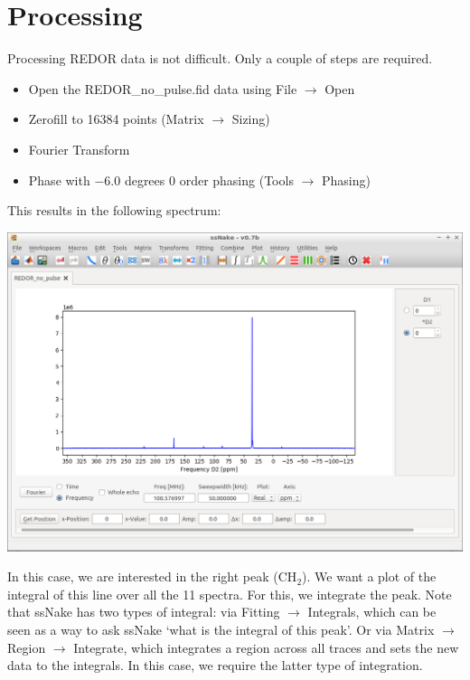 \documentclass[11pt,a4paper]{article}
\begin{document}
\section{Processing}
Processing REDOR data is not difficult.
Only a couple of steps are required.

\begin{itemize}
\item Open the REDOR\_no\_pulse.fid data using File $\longrightarrow$ Open
\item Zerofill to 16384 points (Matrix  $\longrightarrow$ Sizing)
\item Fourier Transform
\item Phase with $-6.0$ degrees 0 order phasing (Tools $\longrightarrow$ Phasing)
\end{itemize}
This results in the following spectrum:
\begin{center}
\includegraphics[width=0.8\linewidth]{Figs/Fig1.png}
\end{center}
In this case, we are interested in the right peak (CH$_2$).
We want a plot of the integral of this line over all the 11 spectra.
For this, we integrate the peak.
Note that ssNake has two types of integral: via Fitting  $\longrightarrow$ Integrals, which can be seen as a way to ask ssNake `what is the integral of this peak'.
Or via Matrix $\longrightarrow$ Region $\longrightarrow$
Integrate, which integrates a region across all traces and sets the new data to the integrals.
In this case, we require the latter type of integration.
\end{document}
